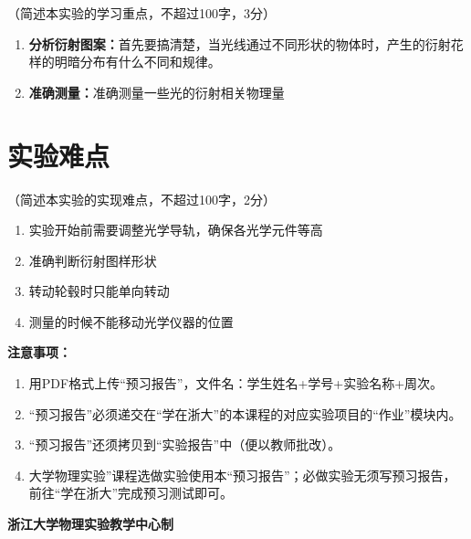 \documentclass[10pt,a4paper]{ctexart}
\newcommand{\myspace}[1]{\par\vspace{#1\baselineskip}} %
\newcommand{\sihao}{\fontsize{14pt}{18pt}\selectfont}
\newcommand{\xiaosi}{\fontsize{12pt}{16pt}\selectfont}
\begin{document}
    \xiaosi（简述本实验的学习重点，不超过100字，3分）

\begin{enumerate}
    \item \textbf{分析衍射图案：}首先要搞清楚，当光线通过不同形状的物体时，产生的衍射花样的明暗分布有什么不同和规律。
    \item \textbf{准确测量：}准确测量一些光的衍射相关物理量
\end{enumerate}
    \myspace{2}
    
    \section{实验难点}

    \xiaosi（简述本实验的实现难点，不超过100字，2分）
\begin{enumerate}
    \item 实验开始前需要调整光学导轨，确保各光学元件等高
    \item 准确判断衍射图样形状
    \item 转动轮毂时只能单向转动
    \item 测量的时候不能移动光学仪器的位置
\end{enumerate}
\myspace{2}


\newpage

\sihao\textbf{注意事项：}
\xiaosi
\begin{enumerate}
    \item 用PDF格式上传“预习报告”，文件名：学生姓名+学号+实验名称+周次。
    \item “预习报告”必须递交在“学在浙大”的本课程的对应实验项目的“作业”模块内。
    \item “预习报告”还须拷贝到“实验报告”中（便以教师批改）。
    \item 大学物理实验”课程选做实验使用本“预习报告”；必做实验无须写预习报告，前往“学在浙大”完成预习测试即可。
\end{enumerate}

\vspace{1cm}
\xiaosi\centering \textbf{浙江大学物理实验教学中心制}
\end{document}
